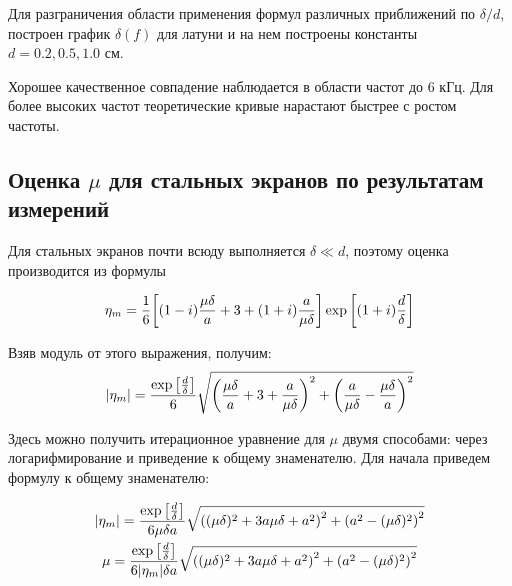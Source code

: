 \documentclass[a4paper,12pt]{article}
\begin{document}
Для разграничения области применения формул различных приближений по $\delta/d$, построен график $\delta(f)$ для латуни и на нем построены константы $d=0.2,0.5,1.0$ см.  

Хорошее качественное совпадение наблюдается в области частот до 6 кГц. Для более высоких частот теоретические кривые нарастают быстрее с ростом частоты.

\subsection{Оценка $\mu$ для стальных экранов по результатам измерений}

Для стальных экранов почти всюду выполняется $\delta \ll d$, поэтому оценка производится из формулы

\begin{gather}
	\eta_m = \frac16\qty[(1-i)\frac{\mu \delta}{a} + 3 + (1+i)\frac{a}{\mu \delta}]\exp\qty[(1+i)\frac{d}{\delta}]
\end{gather}

Взяв модуль от этого выражения, получим:
\begin{gather}
	|\eta_m| = \frac{\exp\qty[\frac{d}{\delta}]}{6}\sqrt{\qty(\frac{\mu \delta}{a} +3 + \frac{a}{\mu \delta} )^2 + \qty(\frac{a}{\mu \delta} - \frac{\mu \delta}{a})^2}
\end{gather}

Здесь можно получить итерационное уравнение для $\mu$ двумя способами: через логарифмирование и приведение к общему знаменателю. Для начала приведем формулу к общему знаменателю:

\begin{gather}
	|\eta_m| = \frac{\exp\qty[\frac{d}{\delta}]}{6 \mu \delta a}\sqrt{\qty((\mu \delta)^2 +3 a \mu \delta + a^2)^2 + \qty(a^2 - (\mu \delta)^2)^2}\\
%
	\mu = \frac{\exp\qty[\frac{d}{\delta}]}{6 |\eta_m| \delta a}\sqrt{\qty((\mu \delta)^2 +3 a \mu \delta + a^2)^2 + \qty(a^2 - (\mu \delta)^2)^2}
\end{gather}


\end{document}
